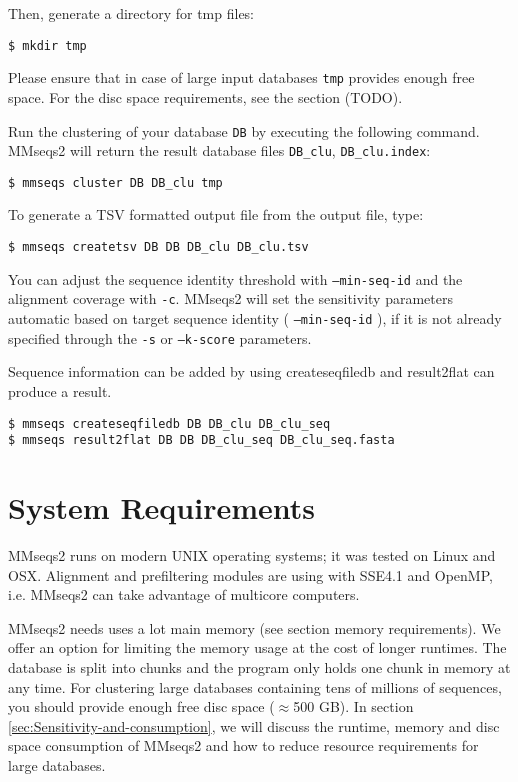 \documentclass[11pt,a4paper]{scrreprt}
\begin{document}
Then, generate a directory for tmp files:

\begin{verbatim}
$ mkdir tmp
\end{verbatim}

Please ensure that in case of large input databases \texttt{tmp} provides enough free space. For the disc space requirements, see the section (TODO).

Run the clustering of your database \texttt{DB} by executing the following command. MMseqs2 will return the result database files \texttt{DB\_clu}, \texttt{DB\_clu.index}:

\begin{verbatim}
$ mmseqs cluster DB DB_clu tmp
\end{verbatim}

To generate a TSV formatted output file from the output file, type:
\begin{verbatim}
$ mmseqs createtsv DB DB DB_clu DB_clu.tsv
\end{verbatim}

You can adjust the sequence identity threshold with \texttt{--min-seq-id} and the alignment coverage with \texttt{-c}. MMseqs2 will set the sensitivity parameters automatic based on target sequence identity ( \texttt{--min-seq-id} ), if it is not already specified through the \texttt{-s} or \texttt{--k-score} parameters.

Sequence information can be added by using createseqfiledb and result2flat can produce a result.

\begin{verbatim}
$ mmseqs createseqfiledb DB DB_clu DB_clu_seq
$ mmseqs result2flat DB DB DB_clu_seq DB_clu_seq.fasta
\end{verbatim}
\section{System Requirements}
MMseqs2 runs on modern UNIX operating systems; it was tested on Linux and OSX. Alignment and prefiltering modules are using with SSE4.1 and OpenMP, i.e. MMseqs2 can take advantage of multicore computers. 

MMseqs2 needs uses a lot main memory (see section memory requirements). We offer an option for limiting the memory usage at the cost of longer runtimes. The database is split into chunks and the program only holds one chunk in memory at any time. For clustering large databases containing tens of millions of sequences, you should provide enough free disc space ($\approx$500 GB). In section \ref{sec:Sensitivity-and-consumption}, we will discuss the runtime, memory and disc space consumption of MMseqs2 and how to reduce resource requirements for large databases.
\end{document}
